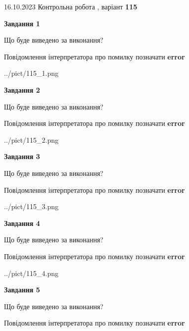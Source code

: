 \documentclass[12pt, ukrainian]{article}
\begin{document}
{\Large{16.10.2023 Контрольна робота , варіант  \No \textbf { 115 }\par}}
{
\begin {large}
{\begin {center}\textbf{Завдання 1}\end {center}}\par
Що буде виведено за виконання? \par
Повідомлення інтерпретатора про помилку позначати \textbf{error}

\begin{center}
	{../pict/115_1.png}
\end{center}
\newpage

{\begin {center}\textbf{Завдання 2}\end {center}}\par
Що буде виведено за виконання? \par
Повідомлення інтерпретатора про помилку позначати \textbf{error}

\begin{center}
	{../pict/115_2.png}
\end{center}
\newpage

{\begin {center}\textbf{Завдання 3}\end {center}}\par
Що буде виведено за виконання? \par
Повідомлення інтерпретатора про помилку позначати \textbf{error}

\begin{center}
	{../pict/115_3.png}
\end{center}
\newpage

{\begin {center}\textbf{Завдання 4}\end {center}}\par
Що буде виведено за виконання? \par
Повідомлення інтерпретатора про помилку позначати \textbf{error}

\begin{center}
	{../pict/115_4.png}
\end{center}
\newpage

{\begin {center}\textbf{Завдання 5}\end {center}}\par
Що буде виведено за виконання? \par
Повідомлення інтерпретатора про помилку позначати \textbf{error}


\end{large}}
\end{document}
